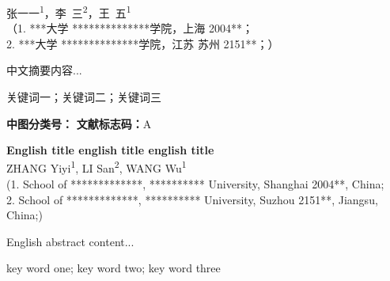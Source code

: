 \maketitle
{\centering\kaishu{}
    张一一\textsuperscript{1}，李~三\textsuperscript{2}，王~五\textsuperscript{1}\\[2ex]
    
    （1. ***大学 **************学院，上海 2004**；\\
    2. ***大学 **************学院，江苏 苏州 2151**；）\\[2ex]
}

\chineseabstract
中文摘要内容...

\chinesekeywords
关键词一；关键词二；关键词三

\noindent{}\songti
\textbf{中图分类号：} \quad \textbf{文献标志码：}A\newline

{\centering
    \textbf{English title english title english title}\\[2ex]
    
    ZHANG Yiyi\textsuperscript{1}, LI San\textsuperscript{2}, WANG Wu\textsuperscript{1}\\[2ex]
    
    (1. School of *************, ********** University, Shanghai 2004**, China;\\
    2. School of *************, ********** University, Suzhou 2151**, Jiangsu, China;)\\[2ex]
}

\englishabstract
English abstract content...

\englishkeywords
key word one; key word two; key word three\\[4ex]